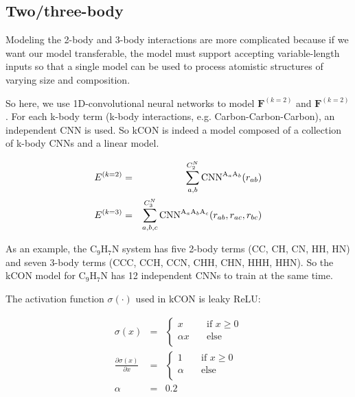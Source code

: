 \subsection{Two/three-body}

Modeling the 2-body and 3-body interactions are more complicated because if we want our model 
transferable, the model must support accepting variable-length inputs so that a single model 
can be used to process atomistic structures of varying size and composition. 

So here, we use 1D-convolutional neural networks to model $\mathbf{F}^{(k=2)}$ and 
$\mathbf{F}^{(k=2)}$. For each k-body term (k-body interactions, e.g. Carbon-Carbon-Carbon),
an independent CNN is used. So kCON is indeed a model composed of a collection of k-body CNNs 
and a linear model.

\begin{eqnarray}
E^{(k=2)} & = & \sum_{a,b}^{C^N_2}{
	\boldmath{\mathrm{CNN}}^{\mathrm{A}_{a}\mathrm{A}_{b}}
}(r_{ab}) \\
\label{eqn:cnn_f_3}
E^{(k=3)} & = & \sum_{a,b,c}^{C^N_3}{
	\boldmath{\mathrm{CNN}}^{\mathrm{A}_{a}\mathrm{A}_{b}\mathrm{A}_{c}}
}(r_{ab}, r_{ac}, r_{bc})
\end{eqnarray}

\noindent As an example, the $\mathrm{C}_9 \mathrm{H}_7 \mathrm{N}$ system has five 2-body 
terms (CC, CH, CN, HH, HN) and seven 3-body terms (CCC, CCH, CCN, CHH, CHN, HHH, HHN). So the 
kCON model for $\mathrm{C}_9 \mathrm{H}_7 \mathrm{N}$ has 12 independent CNNs to train at the 
same time.

The activation function $\sigma(\cdot)$ used in kCON is leaky ReLU:

\begin{eqnarray}\label{eqn:lrelu}
\sigma(x) & = & \begin{cases}
	x & \quad \text{if } x \geq 0 \\
	\alpha x & \quad \text{else} \\
\end{cases} \\
\frac{\partial{\sigma(x)}}{\partial{x}} & = & \begin{cases}
	1 & \quad \text{if } x \geq 0 \\
	\alpha & \quad \text{else} \\
\end{cases} \\
\alpha & = & 0.2
\end{eqnarray}

